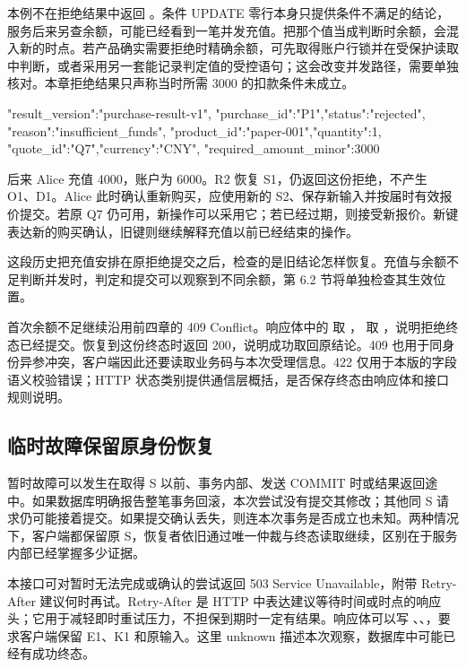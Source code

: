 本例不在拒绝结果中返回 。条件 UPDATE 零行本身只提供条件不满足的结论，服务后来另查余额，可能已经看到一笔并发充值。把那个值当成判断时余额，会混入新的时点。若产品确实需要拒绝时精确余额，可先取得账户行锁并在受保护读取中判断，或者采用另一套能记录判定值的受控语句；这会改变并发路径，需要单独核对。本章拒绝结果只声称当时所需 3000 的扣款条件未成立。

\begin{BookCode}
{"result_version":"purchase-result-v1",
 "purchase_id":"P1","status":"rejected",
 "reason":"insufficient_funds",
 "product_id":"paper-001","quantity":1,
 "quote_id":"Q7","currency":"CNY",
 "required_amount_minor":3000}
\end{BookCode}

后来 Alice 充值 4000，账户为 6000。R2 恢复 S1，仍返回这份拒绝，不产生 O1、D1。Alice 此时确认重新购买，应使用新的 S2、保存新输入并按届时有效报价提交。若原 Q7 仍可用，新操作可以采用它；若已经过期，则接受新报价。新键表达新的购买确认，旧键则继续解释充值以前已经结束的操作。



这段历史把充值安排在原拒绝提交之后，检查的是旧结论怎样恢复。充值与余额不足判断并发时，判定和提交可以观察到不同余额，第 6.2 节将单独检查其生效位置。

首次余额不足继续沿用前四章的 409 Conflict。响应体中的  取 ， 取 ，说明拒绝终态已经提交。恢复到这份终态时返回 200，说明成功取回原结论。409 也用于同身份异参冲突，客户端因此还要读取业务码与本次受理信息。422 仅用于本版的字段语义校验错误；HTTP 状态类别提供通信层概括，是否保存终态由响应体和接口规则说明\cite{http}。

\subsection*{临时故障保留原身份恢复}

暂时故障可以发生在取得 S 以前、事务内部、发送 COMMIT 时或结果返回途中。如果数据库明确报告整笔事务回滚，本次尝试没有提交其修改；其他同 S 请求仍可能接着提交。如果提交确认丢失，则连本次事务是否成立也未知。两种情况下，客户端都保留原 S，恢复者依旧通过唯一仲裁与终态读取继续，区别在于服务内部已经掌握多少证据。

本接口可对暂时无法完成或确认的尝试返回 503 Service Unavailable，附带 Retry-After 建议何时再试。Retry-After 是 HTTP 中表达建议等待时间或时点的响应头；它用于减轻即时重试压力，不担保到期时一定有结果。响应体可以写 、、，要求客户端保留 E1、K1 和原输入。这里 unknown 描述本次观察，数据库中可能已经有成功终态\cite{http}。


